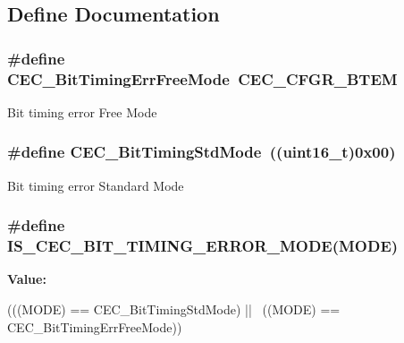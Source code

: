 \subsection{Define Documentation}
\hypertarget{group__CEC__BitTiming__Mode_ga4fd44675c774985d1f6cd8976b18c947}{
\subsubsection[{CEC\_\-BitTimingErrFreeMode}]{\setlength{\rightskip}{0pt plus 5cm}\#define CEC\_\-BitTimingErrFreeMode~CEC\_\-CFGR\_\-BTEM}}
\label{group__CEC__BitTiming__Mode_ga4fd44675c774985d1f6cd8976b18c947}
Bit timing error Free Mode \hypertarget{group__CEC__BitTiming__Mode_gaf6866e5087bb01c1ea4e20a207a1f691}{
\subsubsection[{CEC\_\-BitTimingStdMode}]{\setlength{\rightskip}{0pt plus 5cm}\#define CEC\_\-BitTimingStdMode~((uint16\_\-t)0x00)}}
\label{group__CEC__BitTiming__Mode_gaf6866e5087bb01c1ea4e20a207a1f691}
Bit timing error Standard Mode \hypertarget{group__CEC__BitTiming__Mode_ga55494269b2c9c55c11130a429f418a8d}{
\subsubsection[{IS\_\-CEC\_\-BIT\_\-TIMING\_\-ERROR\_\-MODE}]{\setlength{\rightskip}{0pt plus 5cm}\#define IS\_\-CEC\_\-BIT\_\-TIMING\_\-ERROR\_\-MODE(MODE)}}
\label{group__CEC__BitTiming__Mode_ga55494269b2c9c55c11130a429f418a8d}
{\bfseries Value:}
\begin{DoxyCode}
(((MODE) == CEC_BitTimingStdMode) || \
                                            ((MODE) == CEC_BitTimingErrFreeMode))
      
\end{DoxyCode}
